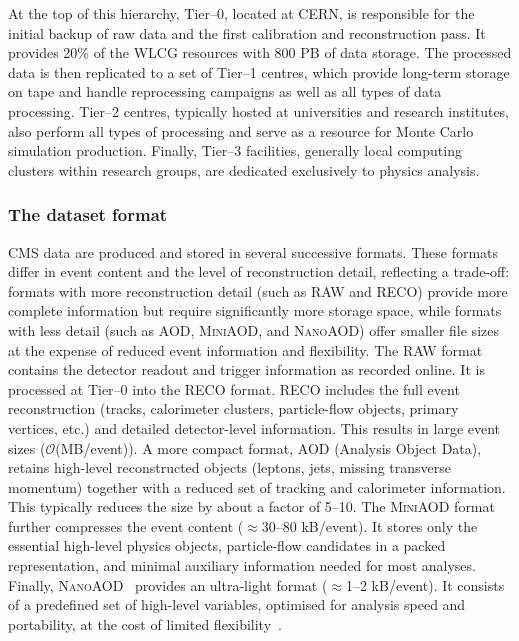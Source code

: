 At the top of this hierarchy, Tier--0, located at CERN, is responsible for the initial backup of raw data and the first calibration and reconstruction pass. It provides 20\% of the WLCG resources with 800 PB of data storage. The processed data is then replicated to a set of Tier--1 centres, which provide long-term storage on tape and handle reprocessing campaigns as well as all types of data processing. Tier--2 centres, typically hosted at universities and research institutes, also perform all types of processing and serve as a resource for Monte Carlo simulation production. Finally, Tier--3 facilities, generally local computing clusters within research groups, are dedicated exclusively to physics analysis.

\subsubsection{The dataset format}

CMS data are produced and stored in several successive formats. These formats differ in event content and the level of reconstruction detail, reflecting a trade-off: formats with more reconstruction detail (such as RAW and RECO) provide more complete information but require significantly more storage space, while formats with less detail (such as \textsc{AOD}, \textsc{MiniAOD}, and \textsc{NanoAOD}) offer smaller file sizes at the expense of reduced event information and flexibility. The RAW format contains the detector readout and trigger information as recorded online. It is processed at Tier--0 into the RECO format. RECO includes the full event reconstruction (tracks, calorimeter clusters, particle-flow objects, primary vertices, etc.) and detailed detector-level information. This results in large event sizes ($\mathcal{O}$(MB/event)). A more compact format, \textsc{AOD} (Analysis Object Data), retains high-level reconstructed objects (leptons, jets, missing transverse momentum) together with a reduced set of tracking and calorimeter information. This typically reduces the size by about a factor of 5--10. The \textsc{MiniAOD} format~\cite{CMS:MiniAOD} further compresses the event content ($\approx$30--80 kB/event). It stores only the essential high-level physics objects, particle-flow candidates in a packed representation, and minimal auxiliary information needed for most analyses. Finally, \textsc{NanoAOD}~\cite{CMS:NanoAOD} provides an ultra-light format ($\approx$1--2 kB/event). It consists of a predefined set of high-level variables, optimised for analysis speed and portability, at the cost of limited flexibility~\cite{CMS:WorkBookDataFormats}.


